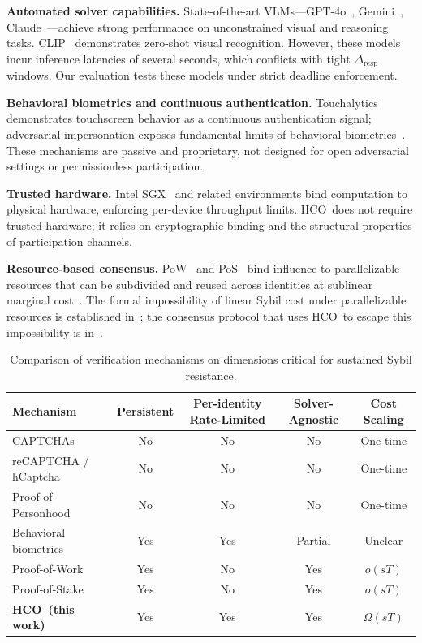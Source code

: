 \documentclass[11pt]{article}
\newcommand{\HCO}{HCO\xspace}
\theoremstyle{remark}
\theoremstyle{plain}
\begin{document}
	\noindent\textbf{Automated solver capabilities.}
	State-of-the-art VLMs---GPT-4o~\cite{openai2023gpt4},
	Gemini~\cite{geminiteam2023}, Claude~\cite{anthropic2024claude}---achieve
	strong performance on unconstrained visual and reasoning tasks.
	CLIP~\cite{radford2021clip} demonstrates zero-shot visual recognition.
	However, these models incur inference latencies of several seconds,
	which conflicts with tight $\Delta_{\mathrm{resp}}$ windows. Our
	evaluation tests these models under strict deadline enforcement.
	
	\noindent\textbf{Behavioral biometrics and continuous authentication.}
	Touchalytics~\cite{frank2013touchalytics} demonstrates touchscreen
	behavior as a continuous authentication signal; adversarial impersonation
	exposes fundamental limits of behavioral
	biometrics~\cite{serwadda2013kids}. These mechanisms are passive and
	proprietary, not designed for open adversarial settings or
	permissionless participation.
	
	\noindent\textbf{Trusted hardware.}
	Intel SGX~\cite{costan2016sgx} and related environments bind computation
	to physical hardware, enforcing per-device throughput limits. \HCO\
	does not require trusted hardware; it relies on cryptographic binding
	and the structural properties of participation channels.
	
	\noindent\textbf{Resource-based consensus.}
	PoW~\cite{nakamoto2008bitcoin} and PoS~\cite{kiayias2017ouroboros} bind
	influence to parallelizable resources that can be subdivided and reused
	across identities at sublinear marginal cost~\cite{bonneau2015sok}.
	The formal impossibility of linear Sybil cost under parallelizable
	resources is established in~\cite{maleki2026geometry}; the consensus
	protocol that uses \HCO\ to escape this impossibility is
	in~\cite{maleki2026pocmt}.
	
	\begin{table}[t]
		\centering
		\caption{Comparison of verification mechanisms on dimensions critical
			for sustained Sybil resistance.}
		\label{tab:hco-taxonomy}
		\begin{tabular}{lcccc}
			\toprule
			Mechanism & Persistent & Per-identity Rate-Limited
			& Solver-Agnostic & Cost Scaling \\
			\midrule
			CAPTCHAs~\cite{vonahn2003captcha}
			& No  & No  & No  & One-time \\
			reCAPTCHA / hCaptcha~\cite{recaptcha2019,hcaptcha2020}
			& No  & No  & No  & One-time \\
			Proof-of-Personhood~\cite{borge2017proofofpersonhood}
			& No  & No  & No  & One-time \\
			Behavioral biometrics~\cite{frank2013touchalytics}
			& Yes & Yes & Partial & Unclear \\
			Proof-of-Work~\cite{nakamoto2008bitcoin}
			& Yes & No  & Yes & $o(sT)$ \\
			Proof-of-Stake~\cite{kiayias2017ouroboros}
			& Yes & No  & Yes & $o(sT)$ \\
			\textbf{\HCO\ (this work)}
			& Yes & Yes & Yes & $\Omega(sT)$ \\
			\bottomrule
		\end{tabular}
	\end{table}
	
\end{document}
